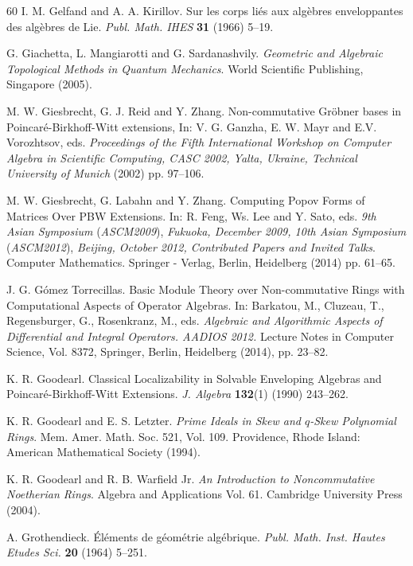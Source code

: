 \documentclass{amsart}
\theoremstyle{definition}
\theoremstyle{remark}
\numberwithin{equation}{section}
\begin{document}
\begin{thebibliography}{60}
 I. M. Gelfand and A. A. Kirillov. Sur les corps li\'es aux algèbres enveloppantes des algèbres de Lie. {\em Publ. Math. IHES} {\bf 31} (1966) 5--19.

 G. Giachetta, L. Mangiarotti and G. Sardanashvily. {\em Geometric and {A}lgebraic {T}opological {M}ethods in {Q}uantum {M}echanics}. World Scientific Publishing, Singapore (2005).

 M. W. Giesbrecht, G. J. Reid and Y. Zhang. Non-commutative Gr\"obner bases in Poincar\'e-Birkhoff-Witt extensions, In: V. G. Ganzha, E. W. Mayr and E.V. Vorozhtsov, eds. {\em Proceedings of the Fifth International Workshop on Computer Algebra in Scientific Computing, CASC 2002, Yalta, Ukraine, Technical University of Munich} (2002) pp. 97--106.

 M. W. Giesbrecht, G. Labahn and Y. Zhang. Computing {P}opov {F}orms of {M}atrices Over {P}{B}{W} {E}xtensions. In: R. Feng, Ws. Lee and Y. Sato, eds. {\em 9th Asian Symposium} ({\em ASCM2009}), {\em Fukuoka, December 2009, 10th Asian Symposium} ({\em ASCM2012}), {\em Beijing, October 2012, Contributed Papers and Invited Talks}. Computer Mathematics. Springer - Verlag, Berlin, Heidelberg (2014) pp. 61--65.

 J. G. G\'omez Torrecillas. Basic Module Theory over Non-commutative Rings with Computational Aspects of Operator Algebras. In: Barkatou, M.,  Cluzeau, T., Regensburger, G., Rosenkranz, M., eds. {\em Algebraic and Algorithmic Aspects of Differential and Integral Operators. AADIOS 2012.} Lecture Notes in Computer Science, Vol. 8372, Springer, Berlin, Heidelberg (2014), pp. 23--82.

 K. R. Goodearl. Classical {L}ocalizability in {S}olvable {E}nveloping {A}lgebras and {P}oincar\'e-{B}irkhoff-{W}itt {E}xtensions. {\em J. Algebra} {\bf 132}(1) (1990) 243--262.

 K. R. Goodearl and E. S. Letzter. {\em Prime {I}deals in {S}kew and $q$-{S}kew {P}olynomial {R}ings}. Mem. Amer. Math. Soc. 521, Vol. 109. Providence, Rhode Island: American Mathematical Society (1994).

 K. R. Goodearl and R. B. Warfield Jr. {\em An Introduction to Noncommutative Noetherian Rings}. Algebra and Applications Vol. 61. Cambridge University Press (2004).

 A. Grothendieck. \'El\'ements de g\'eom\'etrie alg\'ebrique. {\em Publ. Math. Inst. Hautes Etudes Sci.} {\bf 20} (1964) 5--251.


\end{thebibliography}
\end{document}
